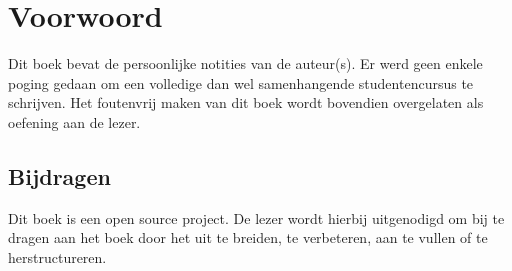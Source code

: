 \documentclass[main.tex]{subfiles}
\begin{document}
\section*{Voorwoord}
Dit boek bevat de persoonlijke notities van de auteur(s).
Er werd geen enkele poging gedaan om een volledige dan wel samenhangende studentencursus te schrijven.
Het foutenvrij maken van dit boek wordt bovendien overgelaten als oefening aan de lezer.

\subsection*{Bijdragen}
Dit boek is een open source project.
De lezer wordt hierbij uitgenodigd om bij te dragen aan het boek door het uit te breiden, te verbeteren, aan te vullen of te herstructureren.
\end{document}
